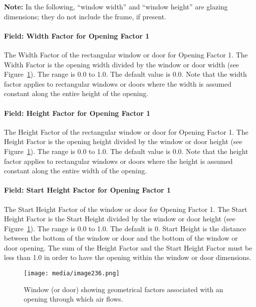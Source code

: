 \textbf{Note:} In the following, ``window width'' and ``window height'' are glazing dimensions; they do not include the frame, if present.

\paragraph{Field: Width Factor for Opening Factor 1}\label{field-width-factor-for-opening-factor-1}

The Width Factor of the rectangular window or door for Opening Factor 1. The Width Factor is the opening width divided by the window or door width (see Figure~\ref{fig:window-or-door-showing-geometrical-factors}). The range is 0.0 to 1.0. The default value is 0.0. Note that the width factor applies to rectangular windows or doors where the width is assumed constant along the entire height of the opening.

\paragraph{Field: Height Factor for Opening Factor 1}\label{field-height-factor-for-opening-factor-1}

The Height Factor of the rectangular window or door for Opening Factor 1. The Height Factor is the opening height divided by the window or door height (see Figure~\ref{fig:window-or-door-showing-geometrical-factors}). The range is 0.0 to 1.0. The default value is 0.0. Note that the height factor applies to rectangular windows or doors where the height is assumed constant along the entire width of the opening.

\paragraph{Field: Start Height Factor for Opening Factor 1}\label{field-start-height-factor-for-opening-factor-1}

The Start Height Factor of the window or door for Opening Factor 1. The Start Height Factor is the Start Height divided by the window or door height (see Figure~\ref{fig:window-or-door-showing-geometrical-factors}). The range is 0.0 to 1.0. The default is 0. Start Height is the distance between the bottom of the window or door and the bottom of the window or door opening. The sum of the Height Factor and the Start Height Factor must be less than 1.0 in order to have the opening within the window or door dimensions.

\begin{figure}[hbtp] %
\centering
\texttt{[image: media/image236.png]}
\caption{Window (or door) showing geometrical factors associated with an opening through which air flows. \protect \label{fig:window-or-door-showing-geometrical-factors}}
\end{figure}

